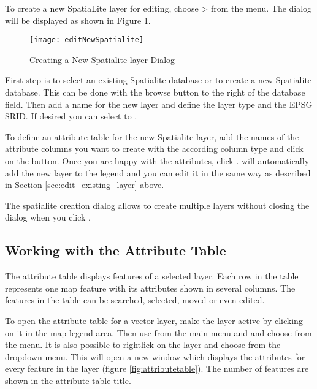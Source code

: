\label{sec:create spatialite}

To create a new SpatiaLite layer for editing, choose  >
 from the
 menu. The  dialog will be
displayed as shown in Figure \ref{fig:newspatialitelayer}.

\begin{figure}[ht]
   \centering
   \texttt{[image: editNewSpatialite]}
   \caption{Creating a New Spatialite layer Dialog \nixcaption}\label{fig:newspatialitelayer}
\end{figure}

First step is to select an existing Spatialite database or to create a new
Spatialite database. This can be done with the browse  button
to the right of the database field. Then add a name for the new layer and
define the layer type and the EPSG SRID. If desired you can select to
.

To define an attribute table for the new Spatialite layer, add the names
of the attribute columns you want to create with the according column type
and click on the  button. Once you are happy
with the attributes, click . \qg will automatically add the new
layer to the legend and you can edit it in the same way as described in
Section \ref{sec:edit_existing_layer} above.

The spatialite creation dialog allows to create multiple layers without
closing the dialog when you click .

\subsection{Working with the Attribute Table}
\label{sec:attribute table}

The attribute table displays features of a selected layer. Each row in the table
represents one map feature with its attributes shown in several columns. The
features in the table can be searched, selected, moved or even edited.

To open the attribute table for a vector layer, make the layer active by clicking
on it in the map legend area. Then use  from the main menu
and and choose 
from the menu. It is also possible to rightlick on the layer and
choose  from the
dropdown menu. This will open a new window which displays the attributes for
every feature in the layer (figure \ref{fig:attributetable}). The number of features
are shown in the attribute table title.

